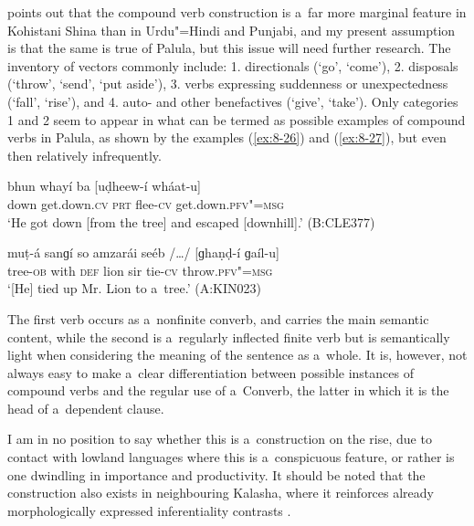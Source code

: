 \citet[20]{schmidt2004b} points out that the compound verb construction is a~far more marginal feature in Kohistani Shina than in Urdu"=Hindi and Punjabi, and my present assumption is that the same is true of Palula, but this issue will need further research. The inventory of vectors commonly include: 1. directionals (`go', `come'), 2. disposals (`throw', `send', `put aside'), 3. verbs expressing suddenness or unexpectedness (`fall', `rise'), and 4. auto- and other benefactives (`give', `take'). Only categories 1 and 2 seem to appear in what can be termed as possible examples of compound verbs in Palula, as shown by the examples (\ref{ex:8-26}) and (\ref{ex:8-27}), but even then relatively infrequently. 

\begin{exe}
\ex
\label{ex:8-26}
\gll bhun whayí ba [uḍheew-í wháat-u] \\
down get.down.\textsc{cv} \textsc{prt} flee-\textsc{cv} get.down.\textsc{pfv"=msg} \\
\glt `He got down [from the tree] and escaped [downhill].' (B:CLE377)
\end{exe}
\begin{exe}
\ex
\label{ex:8-27}
\gll muṭ-á sanɡí so amzarái seéb /{\ldots}/ [ɡhaṇḍ-í ɡaíl-u] \\
tree-\textsc{ob} with \textsc{def} lion sir {} tie-\textsc{cv} throw.\textsc{pfv"=msg} \\
\glt `[He] tied up Mr. Lion to a~tree.' (A:KIN023)
\end{exe}

The first verb occurs as a~nonfinite converb, and carries the main semantic content, while the second is a~regularly inflected finite verb but is semantically light when considering the meaning of the sentence as a~whole. It is, however, not always easy to make a~clear differentiation between possible instances of compound verbs and the regular use of a~Converb, the latter in which it is the head of a~dependent clause. 



I am in no position to say whether this is a~construction on the rise, due to contact with lowland languages where this is a~conspicuous feature, or rather is one dwindling in importance and productivity. It should be noted that the construction also exists in neighbouring Kalasha, where it reinforces already morphologically expressed inferentiality contrasts \citep[1--4]{bashir1993}.